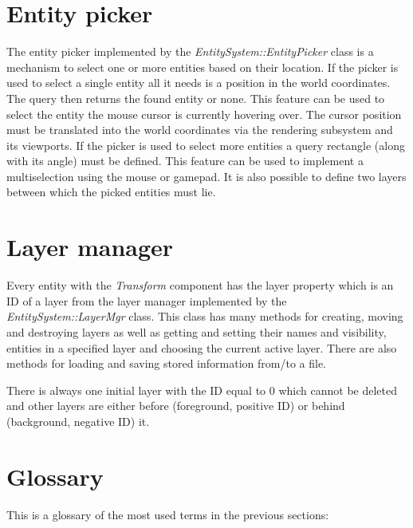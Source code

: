 \documentclass[a4paper, 12pt]{report}
\begin{document}
\section{Entity picker}

The entity picker implemented by the \emph{EntitySystem::EntityPicker} class is a mechanism to select one or more entities based on their location. If the picker is used to select a single entity all it needs is a position in the world coordinates. The query then returns the found entity or none. This feature can be used to select the entity the mouse cursor is currently hovering over. The cursor position must be translated into the world coordinates via the rendering subsystem and its viewports. If the picker is used to select more entities a query rectangle (along with its angle) must be defined. This feature can be used to implement a multiselection using the mouse or gamepad. It is also possible to define two layers between which the picked entities must lie.

\section{Layer manager}

Every entity with the \emph{Transform} component has the layer property which is an ID of a layer from the layer manager implemented by the \emph{EntitySystem::LayerMgr} class. This class has many methods for creating, moving and destroying layers as well as getting and setting their names and visibility, entities in a specified layer and choosing the current active layer. There are also methods for loading and saving stored information from/to a file.

There is always one initial layer with the ID equal to 0 which cannot be deleted and other layers are either before (foreground, positive ID) or behind (background, negative ID) it.

\section{Glossary}

This is a glossary of the most used terms in the previous sections:
\end{document}
